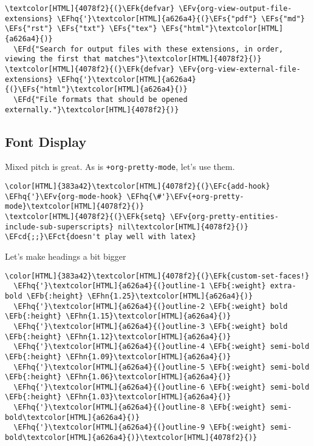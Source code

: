 \documentclass{scrartcl}
\newcommand{\EFk}[1]{\textcolor{EFk}{#1}} %
\newcommand{\EFd}[1]{\textcolor{EFd}{\textit{#1}}} %
\newcommand{\EFs}[1]{\textcolor{EFs}{#1}} %
\newcommand{\EFb}[1]{\textcolor{EFb}{#1}} %
\newcommand{\EFct}[1]{\textcolor{EFct}{#1}} %
\newcommand{\EFc}[1]{\textcolor{EFc}{#1}} %
\newcommand{\EFv}[1]{\textcolor{EFv}{#1}} %
\newcommand{\EFcd}[1]{\textcolor{EFcd}{#1}} %
\newcommand{\EFhn}[1]{\textcolor{EFhn}{\textbf{#1}}} %
\newcommand{\EFhq}[1]{\textcolor{EFhq}{#1}} %
\begin{document}
\begin{Code}
\begin{Verbatim}[]
\textcolor[HTML]{4078f2}{(}\EFk{defvar} \EFv{org-view-output-file-extensions} \EFhq{'}\textcolor[HTML]{a626a4}{(}\EFs{"pdf"} \EFs{"md"} \EFs{"rst"} \EFs{"txt"} \EFs{"tex"} \EFs{"html"}\textcolor[HTML]{a626a4}{)}
  \EFd{"Search for output files with these extensions, in order, viewing the first that matches"}\textcolor[HTML]{4078f2}{)}
\textcolor[HTML]{4078f2}{(}\EFk{defvar} \EFv{org-view-external-file-extensions} \EFhq{'}\textcolor[HTML]{a626a4}{(}\EFs{"html"}\textcolor[HTML]{a626a4}{)}
  \EFd{"File formats that should be opened externally."}\textcolor[HTML]{4078f2}{)}
\end{Verbatim}
\end{Code}

\subsection{Font Display}
\label{sec:org0436734}
Mixed pitch is great. As is \texttt{+org-pretty-mode}, let's use them.
\begin{Code}
\begin{Verbatim}[]
\color[HTML]{383a42}\textcolor[HTML]{4078f2}{(}\EFc{add-hook} \EFhq{'}\EFv{org-mode-hook} \EFhq{\#'}\EFv{+org-pretty-mode}\textcolor[HTML]{4078f2}{)}
\textcolor[HTML]{4078f2}{(}\EFk{setq} \EFv{org-pretty-entities-include-sub-superscripts} nil\textcolor[HTML]{4078f2}{)} \EFcd{;;}\EFct{doesn't play well with latex}
\end{Verbatim}
\end{Code}

Let's make headings a bit bigger
\begin{Code}
\begin{Verbatim}[]
\color[HTML]{383a42}\textcolor[HTML]{4078f2}{(}\EFk{custom-set-faces!}
  \EFhq{'}\textcolor[HTML]{a626a4}{(}outline-1 \EFb{:weight} extra-bold \EFb{:height} \EFhn{1.25}\textcolor[HTML]{a626a4}{)}
  \EFhq{'}\textcolor[HTML]{a626a4}{(}outline-2 \EFb{:weight} bold \EFb{:height} \EFhn{1.15}\textcolor[HTML]{a626a4}{)}
  \EFhq{'}\textcolor[HTML]{a626a4}{(}outline-3 \EFb{:weight} bold \EFb{:height} \EFhn{1.12}\textcolor[HTML]{a626a4}{)}
  \EFhq{'}\textcolor[HTML]{a626a4}{(}outline-4 \EFb{:weight} semi-bold \EFb{:height} \EFhn{1.09}\textcolor[HTML]{a626a4}{)}
  \EFhq{'}\textcolor[HTML]{a626a4}{(}outline-5 \EFb{:weight} semi-bold \EFb{:height} \EFhn{1.06}\textcolor[HTML]{a626a4}{)}
  \EFhq{'}\textcolor[HTML]{a626a4}{(}outline-6 \EFb{:weight} semi-bold \EFb{:height} \EFhn{1.03}\textcolor[HTML]{a626a4}{)}
  \EFhq{'}\textcolor[HTML]{a626a4}{(}outline-8 \EFb{:weight} semi-bold\textcolor[HTML]{a626a4}{)}
  \EFhq{'}\textcolor[HTML]{a626a4}{(}outline-9 \EFb{:weight} semi-bold\textcolor[HTML]{a626a4}{)}\textcolor[HTML]{4078f2}{)}
\end{Verbatim}
\end{Code}
\end{document}
